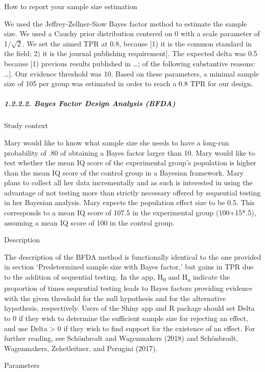 \documentclass[
  english,
  man,floatsintext]{apa6}
\let\oldsubparagraph\subparagraph
\renewcommand{\subparagraph}[1]{\oldsubparagraph{#1}\mbox{}}
\begin{document}
How to report your sample size estimation

We used the Jeffrey-Zellner-Siow Bayes factor method to estimate the sample size. We used a Cauchy prior distribution centered on 0 with a scale parameter of 1/\(\sqrt{2}\). We set the aimed TPR at 0.8, because {[}1) it is the common standard in the field; 2) it is the journal publishing requirement{]}. The expected delta was 0.5 because {[}1) previous results published in \ldots; of the following substantive reasons: \ldots{]}. Our evidence threshold was 10. Based on these parameters, a minimal sample size of 105 per group was estimated in order to reach a 0.8 TPR for our design.

\hypertarget{bayes-factor-design-analysis-bfda}{%
\subparagraph{1.2.2.2. Bayes Factor Design Analysis (BFDA)}\label{bayes-factor-design-analysis-bfda}}

Study context

Mary would like to know what sample size she needs to have a long-run probability of .80 of obtaining a Bayes factor larger than 10. Mary would like to test whether the mean IQ score of the experimental group's population is higher than the mean IQ score of the control group in a Bayesian framework. Mary plans to collect all her data incrementally and as such is interested in using the advantage of not testing more than strictly necessary offered by sequential testing in her Bayesian analysis. Mary expects the population effect size to be 0.5. This corresponds to a mean IQ score of 107.5 in the experimental group (100+15*.5), assuming a mean IQ score of 100 in the control group.

Description

The description of the BFDA method is functionally identical to the one provided in section `Predetermined sample size with Bayes factor,' but gains in TPR due to the addition of sequential testing. In the app, H\textsubscript{0} and H\textsubscript{a} indicate the proportion of times sequential testing leads to Bayes factors providing evidence with the given threshold for the null hypothesis and for the alternative hypothesis, respectively. Users of the Shiny app and R package should set Delta to 0 if they wish to determine the sufficient sample size for rejecting an effect, and use Delta \textgreater{} 0 if they wish to find support for the existence of an effect. For further reading, see Schönbrodt and Wagenmakers (2018) and Schönbrodt, Wagenmakers, Zehetleitner, and Perugini (2017).

Parameters
\end{document}
